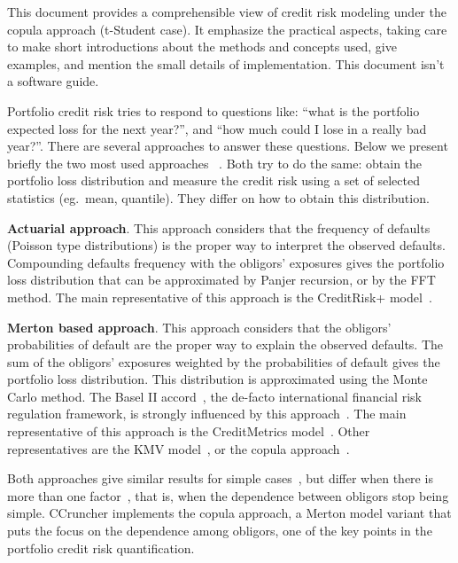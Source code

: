\documentclass[11pt,fleqn]{book} %
\begin{document}
This document provides a comprehensible view of credit risk modeling under the
copula approach (t-Student case). It emphasize the practical aspects, taking 
care to make short introductions about the methods and concepts used, give 
examples, and mention the small details of implementation. This document isn't 
a software guide.

Portfolio credit risk tries to respond to questions like: \enquote{what is the 
portfolio expected loss for the next year?}, and \enquote{how much could I 
lose in a really bad year?}. There are several approaches to answer these 
questions. Below we present briefly the two most used approaches~\cite{crouhy:2000} 
\cite[chap. 2.4]{bluhm:2002}. Both try to do the same: obtain the portfolio 
loss distribution and measure the credit risk using a set of selected 
statistics (eg.\ mean, quantile). They differ on how to obtain this 
distribution. 

\textbf{Actuarial approach}. This approach considers that the frequency 
of defaults (Poisson type distributions) is the proper way to interpret the 
observed defaults. Compounding defaults frequency with the obligors' exposures 
gives the portfolio loss distribution that can be approximated by Panjer 
recursion, or by the FFT method. The main representative of this approach is 
the CreditRisk+ model~\cite{creditrisk+:1997}.

\textbf{Merton based approach}. This approach considers that the obligors' 
probabilities of default are the proper way to explain the observed defaults.
The sum of the obligors' exposures weighted by the probabilities of default 
gives the portfolio loss distribution. This distribution is approximated 
using the Monte Carlo method. The Basel II accord~\cite{basel2:2006}, the 
de-facto international financial risk regulation framework, is strongly 
influenced by this approach~\cite{cespedes:2002}. The main representative of 
this approach is the CreditMetrics\texttrademark{} model~\cite{cmetrics:1997}. 
Other representatives are the KMV model~\cite{kmv:2003}, or the copula 
approach~\cite{li:2000}. 

Both approaches give similar results for simple cases~\cite{koyluoglu:1998},
but differ when there is more than one factor~\cite{bluhm:2001}, that is, 
when the dependence between obligors stop being simple.
CCruncher implements the copula approach, a Merton model variant that puts 
the focus on the dependence among obligors, one of the key points in the 
portfolio credit risk quantification.
\end{document}
